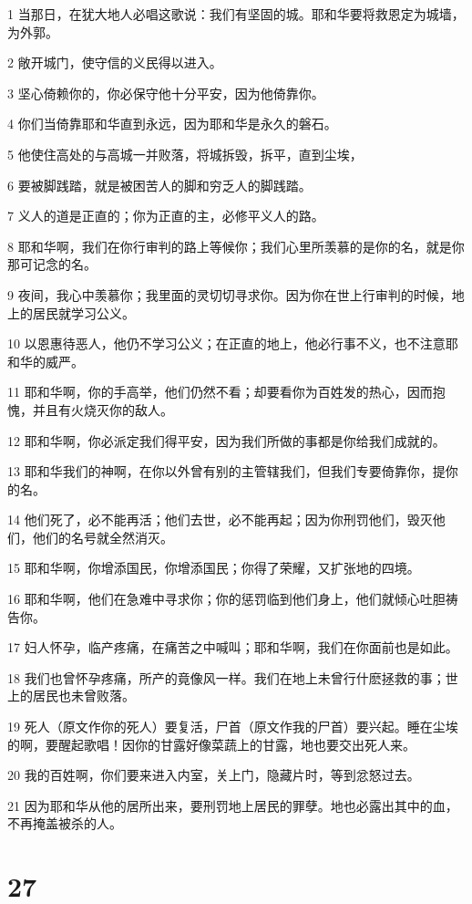 \par 1 当那日，在犹大地人必唱这歌说：我们有坚固的城。耶和华要将救恩定为城墙，为外郭。
\par 2 敞开城门，使守信的义民得以进入。
\par 3 坚心倚赖你的，你必保守他十分平安，因为他倚靠你。
\par 4 你们当倚靠耶和华直到永远，因为耶和华是永久的磐石。
\par 5 他使住高处的与高城一并败落，将城拆毁，拆平，直到尘埃，
\par 6 要被脚践踏，就是被困苦人的脚和穷乏人的脚践踏。
\par 7 义人的道是正直的；你为正直的主，必修平义人的路。
\par 8 耶和华啊，我们在你行审判的路上等候你；我们心里所羡慕的是你的名，就是你那可记念的名。
\par 9 夜间，我心中羡慕你；我里面的灵切切寻求你。因为你在世上行审判的时候，地上的居民就学习公义。
\par 10 以恩惠待恶人，他仍不学习公义；在正直的地上，他必行事不义，也不注意耶和华的威严。
\par 11 耶和华啊，你的手高举，他们仍然不看；却要看你为百姓发的热心，因而抱愧，并且有火烧灭你的敌人。
\par 12 耶和华啊，你必派定我们得平安，因为我们所做的事都是你给我们成就的。
\par 13 耶和华我们的神啊，在你以外曾有别的主管辖我们，但我们专要倚靠你，提你的名。
\par 14 他们死了，必不能再活；他们去世，必不能再起；因为你刑罚他们，毁灭他们，他们的名号就全然消灭。
\par 15 耶和华啊，你增添国民，你增添国民；你得了荣耀，又扩张地的四境。
\par 16 耶和华啊，他们在急难中寻求你；你的惩罚临到他们身上，他们就倾心吐胆祷告你。
\par 17 妇人怀孕，临产疼痛，在痛苦之中喊叫；耶和华啊，我们在你面前也是如此。
\par 18 我们也曾怀孕疼痛，所产的竟像风一样。我们在地上未曾行什麽拯救的事；世上的居民也未曾败落。
\par 19 死人（原文作你的死人）要复活，尸首（原文作我的尸首）要兴起。睡在尘埃的啊，要醒起歌唱！因你的甘露好像菜蔬上的甘露，地也要交出死人来。
\par 20 我的百姓啊，你们要来进入内室，关上门，隐藏片时，等到忿怒过去。
\par 21 因为耶和华从他的居所出来，要刑罚地上居民的罪孽。地也必露出其中的血，不再掩盖被杀的人。

\chapter{27}


